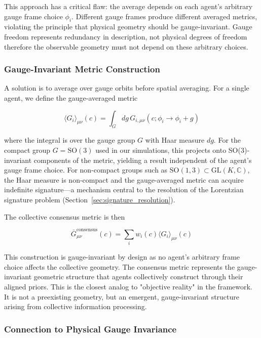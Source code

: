 \documentclass[11pt]{article}
\begin{document}
This approach has a critical flaw: the average depends on each agent's arbitrary gauge frame choice $\phi_i$. Different gauge frames produce different averaged metrics, violating the principle that physical geometry should be gauge-invariant. Gauge freedom represents redundancy in description, not physical degrees of freedom therefore the observable geometry must not depend on these arbitrary choices.

\subsubsection{Gauge-Invariant Metric Construction}

A solution is to average over gauge orbits before spatial averaging. For a single agent, we define the gauge-averaged metric

\begin{equation}
\langle G_i \rangle_{\mu\nu}(c) = \int_G dg \, G_{i,\mu\nu}(c; \phi_i \to \phi_i + g)
\end{equation}

where the integral is over the gauge group $G$ with Haar measure $dg$. For the compact group $G = \mathrm{SO}(3)$ used in our simulations, this projects onto SO(3)-invariant components of the metric, yielding a result independent of the agent's gauge frame choice. For non-compact groups such as $\mathrm{SO}(1,3) \subset \mathrm{GL}(K, \mathbb{C})$, the Haar measure is non-compact and the gauge-averaged metric can acquire indefinite signature---a mechanism central to the resolution of the Lorentzian signature problem (Section~\ref{sec:signature_resolution}).

The collective consensus metric is then

\begin{equation}
\bar{G}_{\mu\nu}^{\text{consensus}}(c) = \sum_i w_i(c) \langle G_i \rangle_{\mu\nu}(c)
\end{equation}

This construction is gauge-invariant by design as no agent's arbitrary frame choice affects the collective geometry. The consensus metric represents the gauge-invariant geometric structure that agents collectively construct through their aligned priors. This is the closest analog to "objective reality" in the framework. It is not a preexisting geometry, but an emergent, gauge-invariant structure arising from collective information processing.

\subsubsection{Connection to Physical Gauge Invariance}
\end{document}
